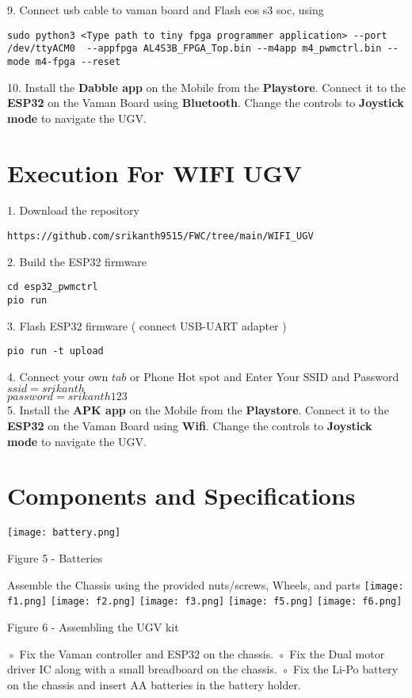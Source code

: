 \documentclass[journal,12pt,twocolumn]{IEEEtran}
\begin{document}
9. Connect usb cable to vaman board and Flash eos s3 soc, using
\begin{lstlisting}
sudo python3 <Type path to tiny fpga programmer application> --port /dev/ttyACM0  --appfpga AL4S3B_FPGA_Top.bin --m4app m4_pwmctrl.bin --mode m4-fpga --reset
\end{lstlisting} 

10. Install the \textbf{Dabble app} on the Mobile from the \textbf{Playstore}. Connect it to the \textbf{ESP32} on the Vaman Board using \textbf{Bluetooth}. Change the controls to \textbf{Joystick mode} to navigate the UGV.\\

\section{Execution For WIFI UGV}
\raggedright
1. Download the repository
\begin{lstlisting}
https://github.com/srikanth9515/FWC/tree/main/WIFI_UGV
\end{lstlisting}

2. Build the ESP32 firmware
\begin{lstlisting}
cd esp32_pwmctrl
pio run
\end{lstlisting} 

3. Flash ESP32 firmware ( connect USB-UART adapter )
\begin{lstlisting}
pio run -t upload
\end{lstlisting} 

4. Connect your own $tab$ or Phone Hot spot and  Enter Your SSID and Password
\\
$ssid = srikanth $    
\\
$password = srikanth123$
\\
5. Install the \textbf{APK app} on the Mobile from the \textbf{Playstore}. Connect it to the \textbf{ESP32} on the Vaman Board using \textbf{Wifi}. Change the controls to \textbf{Joystick mode} to navigate the UGV.\\

\section{Components and Specifications}

\texttt{[image: battery.png]}
\centerline{Figure 5 - Batteries}
Assemble the Chassis using the provided nuts/screws, Wheels, and parts
\texttt{[image: f1.png]}
\texttt{[image: f2.png]}
\texttt{[image: f3.png]}
\texttt{[image: f5.png]}
\texttt{[image: f6.png]}
\centerline{Figure 6 - Assembling the UGV kit}
◦ Fix the Vaman controller and ESP32 on the chassis.
◦ Fix the Dual motor driver IC along with a small breadboard on the chassis.
◦ Fix the Li-Po battery on the chassis and insert AA batteries in the battery holder.
\end{document}
